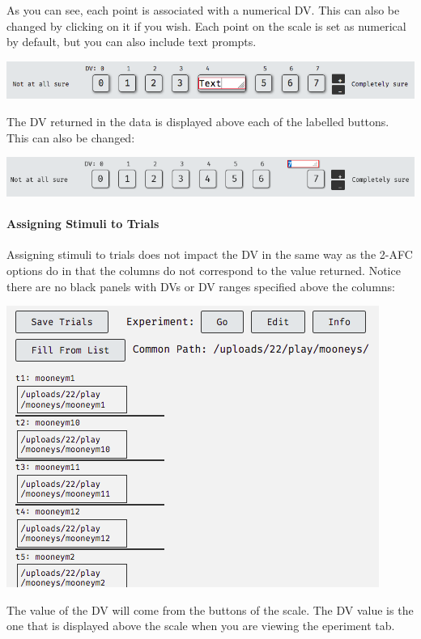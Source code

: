\documentclass[]{book}
\let\oldparagraph\paragraph
\renewcommand{\paragraph}[1]{\oldparagraph{#1}\mbox{}}
\begin{document}
As you can see, each point is associated with a numerical DV. This can
also be changed by clicking on it if you wish. Each point on the scale
is set as numerical by default, but you can also include text prompts.

\includegraphics{images/screenshots/exp_11.png}

The DV returned in the data is displayed above each of the labelled
buttons. This can also be changed:

\includegraphics{images/screenshots/exp_12.png}

\paragraph{Assigning Stimuli to
Trials}\label{assigning-stimuli-to-trials}

Assigning stimuli to trials does not impact the DV in the same way as
the 2-AFC options do in that the columns do not correspond to the value
returned. Notice there are no black panels with DVs or DV ranges
specified above the columns:

\includegraphics{images/screenshots/stim_lb.png}

The value of the DV will come from the buttons of the scale. The DV
value is the one that is displayed above the scale when you are viewing
the eperiment tab.
\end{document}
